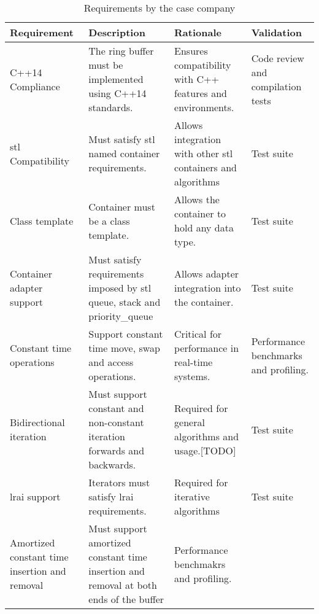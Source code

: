 \begin{table}[h]
  \centering
  \caption{Requirements by the case company}%
  \vspace{-16.5pt}%
  \begin{tabular}{| 
  >{\centering\arraybackslash}p{} | 
  >{\centering\arraybackslash}p{} | 
  >{\centering\arraybackslash}p{} | 
  >{\centering\arraybackslash}p{} |}
    \hline
    Requirement & Description & Rationale & Validation  \\
    \hline
    C++14 Compliance &  The ring buffer must be implemented using C++14 standards. & Ensures compatibility with C++ features and environments. & Code review and compilation tests \\
    \hline
    \gls{stl} Compatibility & Must satisfy \gls{stl} named container requirements. & Allows integration with other \gls{stl} containers
    and algorithms & Test suite \\
    \hline 
    Class template & Container must be a class template. & Allows the container to hold any data type. & Test suite \\
    \hline 
    Container adapter support & Must satisfy requirements imposed by \gls{stl} queue, stack and priority\_queue & Allows adapter integration into the container. & Test suite \\
    \hline
    Constant time operations &  Support constant time move, swap and access operations. & Critical for performance in real-time systems. & Performance benchmarks and profiling. \\
    \hline
    Bidirectional iteration & Must support constant and non-constant iteration forwards and backwards. & Required for general algorithms and usage.[TODO] & Test suite \\
    \hline
    \gls{lrai} support & Iterators must satisfy \gls{lrai} requirements. & Required for iterative algorithms & Test suite \\
    \hline
    Amortized constant time insertion and removal & Must support amortized constant time insertion and removal at both ends of the buffer & Performance benchmakrs and profiling.\\
    \hline
    
  \end{tabular}
  \label{table:some_data}
\end{table}

